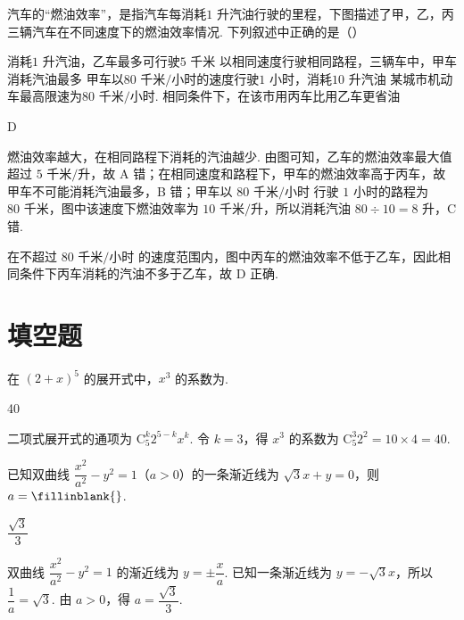\begin{problem}
汽车的“燃油效率”，是指汽车每消耗\(1\text{ 升}\)汽油行驶的里程，下图描述了甲，乙，丙三辆汽车在不同速度下的燃油效率情况. 下列叙述中正确的是（\quad）


\choices
    {消耗\(1\text{ 升}\)汽油，乙车最多可行驶\(5\text{ 千米}\)}
    {以相同速度行驶相同路程，三辆车中，甲车消耗汽油最多}
    {甲车以\(80\text{ 千米/小时}\)的速度行驶\(1\text{ 小时}\)，消耗\(10\text{ 升}\)汽油}
    {某城市机动车最高限速为\(80\text{ 千米/小时}\). 相同条件下，在该市用丙车比用乙车更省油}

\begin{answer}
D
\end{answer}

\begin{solution}
燃油效率越大，在相同路程下消耗的汽油越少. 由图可知，乙车的燃油效率最大值超过 \(5\text{ 千米/升}\)，故 A 错；在相同速度和路程下，甲车的燃油效率高于丙车，故甲车不可能消耗汽油最多，B 错；甲车以 \(80\text{ 千米/小时}\) 行驶 \(1\) 小时的路程为 \(80\text{ 千米}\)，图中该速度下燃油效率为 \(10\text{ 千米/升}\)，所以消耗汽油 \(80\div10=8\text{ 升}\)，C 错.

在不超过 \(80\text{ 千米/小时}\) 的速度范围内，图中丙车的燃油效率不低于乙车，因此相同条件下丙车消耗的汽油不多于乙车，故 D 正确.
\end{solution}
\end{problem}

\section{填空题}

\begin{problem}
在 \((2 + x)^5\) 的展开式中，\(x^3\) 的系数为\fillinblank{}.

\begin{answer}
40
\end{answer}

\begin{solution}
二项式展开式的通项为 \(\mathrm C_5^k2^{5-k}x^k\). 令 \(k=3\)，得 \(x^3\) 的系数为 \(\mathrm C_5^3 2^2=10\times4=40\).
\end{solution}
\end{problem}

\begin{problem}
已知双曲线 \(\dfrac{x^2}{a^2}-y^2=1\)（\(a>0\)）的一条渐近线为 \(\sqrt{3}x+y=0\)，则 \(a=\fillinblank{}\).

\begin{answer}
\(\dfrac{\sqrt{3}}{3}\)
\end{answer}

\begin{solution}
双曲线 \(\dfrac{x^2}{a^2}-y^2=1\) 的渐近线为 \(y=\pm\dfrac{x}{a}\). 已知一条渐近线为 \(y=-\sqrt3x\)，所以 \(\dfrac{1}{a}=\sqrt3\). 由 \(a>0\)，得 \(a=\dfrac{\sqrt3}{3}\).
\end{solution}
\end{problem}

